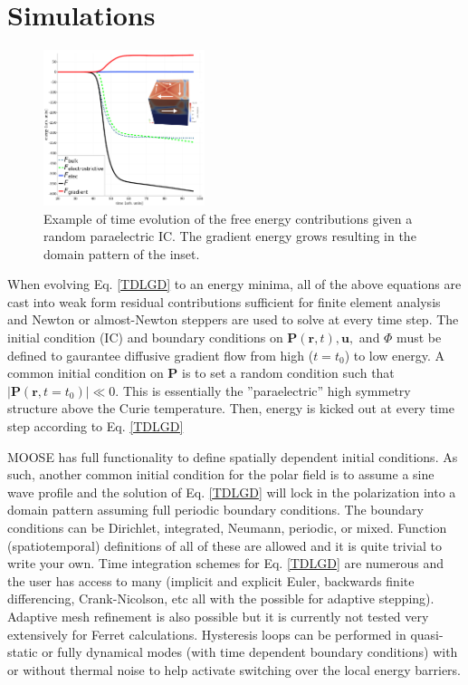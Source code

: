\documentclass[paper=a4,14pt]{scrartcl} %
\begin{document}
\section*{Simulations}
%
%
\begin{figure}
  \begin{center}
\vspace{-50pt}
    \includegraphics[width=0.42\textwidth]{time_evol.png}
  \end{center}
  \caption{Example of time evolution of the free energy contributions given a random paraelectric IC. The gradient energy grows resulting in the domain pattern of the inset.}
\end{figure}
%
When evolving Eq. \ref{TDLGD} to an energy minima, all of the above equations are cast into weak form residual contributions sufficient for finite element analysis and Newton or almost-Newton steppers are used to solve at every time step.
%
The initial condition (IC) and boundary conditions on $\textbf{P}(\textbf{r},t), \textbf{u},$ and $\Phi$ must be defined to gaurantee diffusive gradient flow from high ($t=t_0$) to low energy.
%
A common initial condition on $\textbf{P}$ is to set a random condition such that $|\textbf{P}(\textbf{r},t=t_0)| \ll 0 $. This is essentially the ''paraelectric'' high symmetry structure above the Curie temperature.
%
Then, energy is kicked out at every time step according to Eq. \ref{TDLGD}
%


%
MOOSE has full functionality to define spatially dependent initial conditions. As such, another common initial condition for the polar field is to assume a sine wave profile and the solution of Eq. \ref{TDLGD} will lock in the polarization into a domain pattern assuming full periodic boundary conditions.
%
The boundary conditions can be Dirichlet, integrated, Neumann, periodic, or mixed. Function (spatiotemporal) definitions of all of these are allowed and it is quite trivial to write your own.
%
Time integration schemes for Eq. \ref{TDLGD} are numerous and the user has access to many (implicit and explicit Euler, backwards finite differencing, Crank-Nicolson, etc all with the possible for adaptive stepping).
%
Adaptive mesh refinement is also possible but it is currently not tested very extensively for Ferret calculations.
%
Hysteresis loops can be performed in quasi-static or fully dynamical modes (with time dependent boundary conditions) with or without thermal noise to help activate switching over the local energy barriers.
\end{document}
